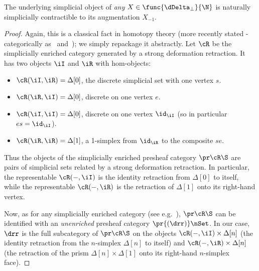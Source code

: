 \begin{lem}
  The underlying simplicial object of \emph{any} $X\in \func{\dDelta_\bot}{\N}$ is naturally simplicially contractible to its augmentation $X_{-1}$.
\end{lem}
\begin{proof}
  Again, this is a classical fact in homotopy theory (more recently stated \io-categorically as~\cite[Lemma 6.1.3.16]{lurie:higher-topoi} and~\cite[Theorem 5.3.1]{rv:2cat-quasi}); we simply repackage it abstractly.
  Let $\cR$ be the simplicially enriched category generated by a strong deformation retraction.
  It has two objects $\iI$ and $\iR$ with hom-objects:
  \begin{itemize}
  \item $\cR(\iI,\iR) = \Delta[0]$, the discrete simplicial set with one vertex $s$.
  \item $\cR(\iR,\iI) = \Delta[0]$, discrete on one vertex $e$.
  \item $\cR(\iI,\iI) = \Delta[0]$, discrete on one vertex $\id_\iI$ (so in particular $e s = \id_{\iI}$).
  \item $\cR(\iR,\iR) = \Delta[1]$, a 1-simplex from $\id_\iR$ to the composite $s e$.
  \end{itemize}
  Thus the objects of the simplicially enriched presheaf category $\pr\cR\S$ are pairs of simplicial sets related by a strong deformation retraction.
  In particular, the representable $\cR(-,\iI)$ is the identity retraction from $\Delta[0]$ to itself, while the representable $\cR(-,\iR)$ is the retraction of $\Delta[1]$ onto its right-hand vertex.

  Now, as for any simplicially enriched category \cR (see e.g.~\cite[C2.5.3]{ptj:elephant}), $\pr\cR\S$ can be identified with an \emph{unenriched} presheaf category $\pr{(\drr)}\nSet$.
  In our case, $\drr$ is the full subcategory of $\pr\cR\S$ on the objects $\cR(-,\iI)\times \Delta[n]$ (the identity retraction from the $n$-simplex $\Delta[n]$ to itself) and $\cR(-,\iR)\times \Delta[n]$ (the retraction of the prism $\Delta[n]\times\Delta[1]$ onto its right-hand $n$-simplex face).


\end{proof}
